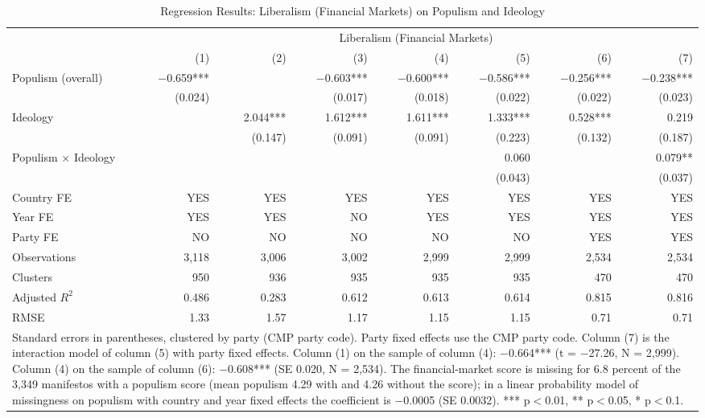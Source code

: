 \begin{table}
\caption{Regression Results: Liberalism (Financial Markets) on Populism and Ideology}
\label{tab:8}
\scriptsize\setlength{\tabcolsep}{4pt}
\centering
\begin{tabular}{lrrrrrrr}
\toprule
 & \multicolumn{7}{c}{Liberalism (Financial Markets)} \\
 & (1) & (2) & (3) & (4) & (5) & (6) & (7) \\
 \midrule
Populism (overall) & $-$0.659*** &  & $-$0.603*** & $-$0.600*** & $-$0.586*** & $-$0.256*** & $-$0.238*** \\
& (0.024) &  & (0.017) & (0.018) & (0.022) & (0.022) & (0.023) \\
Ideology &  & 2.044*** & 1.612*** & 1.611*** & 1.333*** & 0.528*** & 0.219 \\
&  & (0.147) & (0.091) & (0.091) & (0.223) & (0.132) & (0.187) \\
Populism $\times$ Ideology &  &  &  &  & 0.060 &  & 0.079** \\
&  &  &  &  & (0.043) &  & (0.037) \\
\midrule
Country FE & YES & YES & YES & YES & YES & YES & YES\\
Year FE & YES & YES & NO & YES & YES & YES & YES\\
Party FE & NO & NO & NO & NO & NO & YES & YES\\
Observations & 3,118 & 3,006 & 3,002 & 2,999 & 2,999 & 2,534 & 2,534 \\
Clusters & 950 & 936 & 935 & 935 & 935 & 470 & 470 \\
Adjusted $R^2$ & 0.486 & 0.283 & 0.612 & 0.613 & 0.614 & 0.815 & 0.816 \\
RMSE & 1.33 & 1.57 & 1.17 & 1.15 & 1.15 & 0.71 & 0.71 \\
\bottomrule
\multicolumn{8}{p{0.9\linewidth}}{\scriptsize Standard errors in parentheses, clustered by party (CMP party code). Party fixed effects use the CMP party code. Column (7) is the interaction model of column (5) with party fixed effects. Column (1) on the sample of column (4): $-$0.664*** (t = $-$27.26, N = 2,999). Column (4) on the sample of column (6): $-$0.608*** (SE 0.020, N = 2,534). The financial-market score is missing for 6.8 percent of the 3,349 manifestos with a populism score (mean populism 4.29 with and 4.26 without the score); in a linear probability model of missingness on populism with country and year fixed effects the coefficient is $-$0.0005 (SE 0.0032). *** p$<$0.01, ** p$<$0.05, * p$<$0.1.} \\
\end{tabular}
\end{table}

